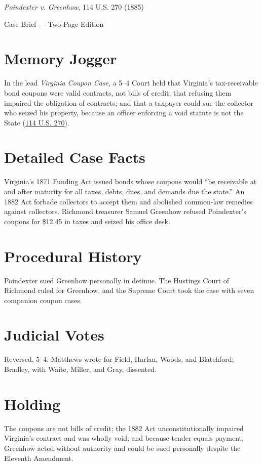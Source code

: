 \documentclass[12pt]{article}
\begin{document}
\begin{center}
{\LARGE \textit{Poindexter v. Greenhow}, 114 U.S. 270 (1885)\par}
\vspace{0.5em}
{\large Case Brief --- Two-Page Edition\par}
\end{center}

\section{Memory Jogger}
In the lead \textit{Virginia Coupon Case}, a 5--4 Court held that Virginia's tax-receivable bond coupons were valid contracts, not bills of credit; that refusing them impaired the obligation of contracts; and that a taxpayer could sue the collector who seized his property, because an officer enforcing a void statute is not the State (\href{https://supreme.justia.com/cases/federal/us/114/270/}{114 U.S. 270}).

\section{Detailed Case Facts}
Virginia's 1871 Funding Act issued bonds whose coupons would ``be receivable at and after maturity for all taxes, debts, dues, and demands due the state.'' An 1882 Act forbade collectors to accept them and abolished common-law remedies against collectors. Richmond treasurer Samuel Greenhow refused Poindexter's coupons for \$12.45 in taxes and seized his office desk.

\section{Procedural History}
Poindexter sued Greenhow personally in detinue. The Hustings Court of Richmond ruled for Greenhow, and the Supreme Court took the case with seven companion coupon cases.

\section{Judicial Votes}
Reversed, 5--4. Matthews wrote for Field, Harlan, Woods, and Blatchford; Bradley, with Waite, Miller, and Gray, dissented.

\section{Holding}
The coupons are not bills of credit; the 1882 Act unconstitutionally impaired Virginia's contract and was wholly void; and because tender equals payment, Greenhow acted without authority and could be sued personally despite the Eleventh Amendment.
\end{document}
